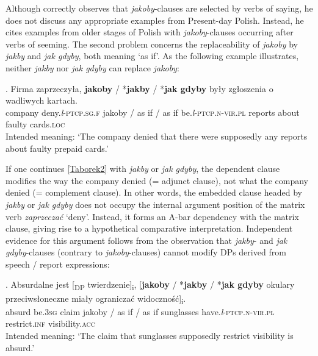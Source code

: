 \documentclass[output=paper
,modfonts
,nonflat]{langsci/langscibook}
\newcommand{\glossformat}[1]{\textsc{#1}}
\newcommand{\thirdperson}{\glossformat{3}\xspace}
\newcommand{\acc}{\glossformat{acc}\xspace}
\newcommand{\fem}{\glossformat{f}\xspace}
\newcommand{\infv}{\glossformat{inf}\xspace}
\newcommand{\loc}{\glossformat{loc}\xspace}
\newcommand{\lptcp}{\emph{l}\glossformat{-ptcp}\xspace}
\newcommand{\nvir}{\glossformat{n-vir}\xspace}
\newcommand{\pl}{\glossformat{pl}\xspace}
\newcommand{\sg}{\glossformat{sg}\xspace}
\begin{document}
\noindent Although \textcite{Taborek2008} correctly observes that \emph{jakoby}-clauses are selected by verbs of saying, he does not discuss any appropriate examples from Present-day Polish. Instead, he cites examples from older stages of Polish with  \emph{jakoby}-clauses occurring after verbs of seeming. The second problem concerns the replaceability of \emph{jakoby} by  \emph{jakby} and \emph{jak gdyby}, both meaning `as if'. As the following example illustrates, neither \emph{jakby} nor \emph{jak gdyby} can replace \emph{jakoby}:  

\exg.		Firma zaprzeczyła, \textbf{jakoby} / *\textbf{jakby} / *\textbf{jak gdyby} były zgłoszenia o wadliwych kartach. \label{Taborek2} \\
		company deny.{\lptcp}.{\sg}.{\fem} jakoby / {as if} / {as if} be.{\lptcp}.{\nvir}.{\pl} reports about faulty cards.{\loc} \\
		Intended meaning: `The company denied that there were supposedly any reports about faulty prepaid cards.' 

If one continues \ref{Taborek2} with \emph{jakby} or \emph{jak gdyby}, the dependent clause modifies the way the company denied (= adjunct clause), not what the company denied (= complement clause). In other words, the embedded clause headed by \emph{jakby} or \emph{jak gdyby} does not occupy the internal argument position of the matrix verb \emph{zaprzeczać} `deny'. Instead, it forms an A-bar dependency with the matrix clause, giving rise to a hypothetical comparative interpretation. Independent evidence for this argument follows from the observation that \emph{jakby}- and \emph{jak gdyby}-clauses (contrary to \emph{jakoby}-clauses) cannot modify DPs derived from speech / report expressions:

\exg.		Absurdalne jest [\textsubscript{DP} twierdzenie]\textsubscript{i}, [\textbf{jakoby} / *\textbf{jakby} / *\textbf{jak gdyby}  {okulary przeciwsłoneczne} miały ograniczać widoczność]\textsubscript{i}. \\ 
		absurd be.{\thirdperson}{\sg} {} claim jakoby / {as if} / {as if} sunglasses have.{\lptcp}.{\nvir}.{\pl}  restrict.{\infv} visibility.{\acc} \\
		Intended meaning: `The claim that  sunglasses supposedly restrict visibility is absurd.'    
\end{document}
